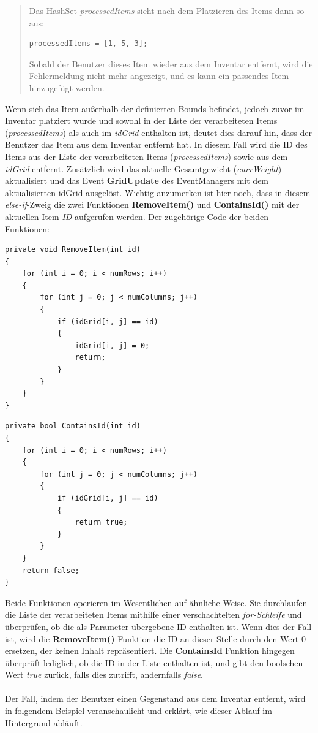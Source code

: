 \begin{quote}
Das HashSet \textit{processedItems} sieht nach dem Platzieren des Items dann so aus:
\begin{lstlisting}[style=csharp, label=code:controller_savedID]
processedItems = [1, 5, 3];
\end{lstlisting}

Sobald der Benutzer dieses Item wieder aus dem Inventar entfernt, wird die Fehlermeldung nicht mehr angezeigt, und es
kann ein passendes Item hinzugefügt werden.\\
\end{quote}

Wenn sich das Item außerhalb der definierten Bounds befindet, jedoch zuvor im Inventar platziert wurde und sowohl in der
Liste der verarbeiteten Items (\textit{processedItems}) als auch im \textit{idGrid} enthalten ist, deutet dies darauf hin,
dass der Benutzer das Item aus dem Inventar entfernt hat. In diesem Fall wird die ID des Items aus der Liste der
verarbeiteten Items (\textit{processedItems}) sowie aus dem \textit{idGrid} entfernt. Zusätzlich wird das aktuelle
Gesamtgewicht (\textit{currWeight}) aktualisiert und das Event \textbf{GridUpdate} des EventManagers mit dem aktualisierten
idGrid ausgelöst. Wichtig anzumerken ist hier noch, dass in diesem \textit{else-if}-Zweig die zwei Funktionen
\textbf{RemoveItem()} und \textbf{ContainsId()} mit der aktuellen Item \textit{ID} aufgerufen werden. Der zugehörige
Code der beiden Funktionen:
\begin{lstlisting}[caption={Item aus Liste entfernen}, label=code:controller_removeItem, language={[Sharp]C}]
private void RemoveItem(int id)
{
    for (int i = 0; i < numRows; i++)
    {
        for (int j = 0; j < numColumns; j++)
        {
            if (idGrid[i, j] == id)
            {
                idGrid[i, j] = 0;
                return;
            }
        }
    }
}
\end{lstlisting}

\begin{lstlisting}[caption={Überprüfen ob ID in Liste enthalten ist}, label=code:controller_checkid, language={[Sharp]C}]
private bool ContainsId(int id)
{
    for (int i = 0; i < numRows; i++)
    {
        for (int j = 0; j < numColumns; j++)
        {
            if (idGrid[i, j] == id)
            {
                return true;
            }
        }
    }
    return false;
}
\end{lstlisting}

Beide Funktionen operieren im Wesentlichen auf ähnliche Weise. Sie durchlaufen die Liste der verarbeiteten Items mithilfe
einer verschachtelten \textit{for-Schleife} und überprüfen, ob die als Parameter übergebene ID enthalten ist. Wenn dies
der Fall ist, wird die \textbf{RemoveItem()} Funktion die ID an dieser Stelle durch den Wert 0 ersetzen, der keinen
Inhalt repräsentiert. Die \textbf{ContainsId} Funktion hingegen überprüft lediglich, ob die ID in der Liste enthalten
ist, und gibt den boolschen Wert \textit{true} zurück, falls dies zutrifft, andernfalls \textit{false}.\\
\\
Der Fall, indem der Benutzer einen Gegenstand aus dem Inventar entfernt, wird in folgendem Beispiel veranschaulicht und
erklärt, wie dieser Ablauf im Hintergrund abläuft.

